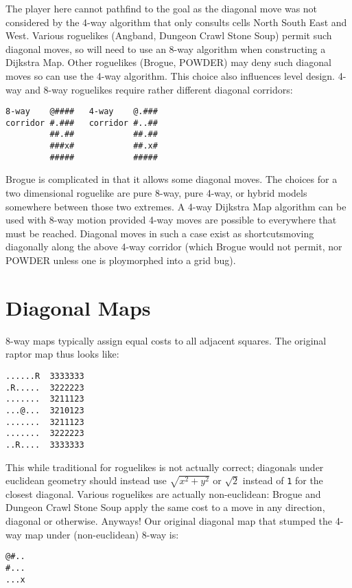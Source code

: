 \documentclass[12pt,a4paper]{article}
\begin{document}
The player here cannot pathfind to the goal as the diagonal move was not
considered by the 4-way algorithm that only consults cells North South
East and West. Various roguelikes (Angband, Dungeon Crawl Stone Soup)
permit such diagonal moves, so will need to use an 8-way algorithm when
constructing a Dijkstra Map. Other roguelikes (Brogue, POWDER) may deny
such diagonal moves so can use the 4-way algorithm. This choice also
influences level design. 4-way and 8-way roguelikes require rather
different diagonal corridors:

\begin{verbatim}
8-way    @####   4-way    @.###
corridor #.###   corridor #..##
         ##.##            ##.##
         ###x#            ##.x#
         #####            #####
\end{verbatim}

Brogue is complicated in that it allows some diagonal moves. The choices
for a two dimensional roguelike are pure 8-way, pure 4-way, or hybrid
models somewhere between those two extremes. A 4-way Dijkstra Map
algorithm can be used with 8-way motion provided 4-way moves are
possible to everywhere that must be reached. Diagonal moves in such a
case exist as shortcuts\textendash moving diagonally along the above
4-way corridor (which Brogue would not permit, nor POWDER unless one is
ploymorphed into a grid bug).

\section*{Diagonal Maps}

8-way maps typically assign equal costs to all adjacent squares. The
original raptor map thus looks like:

\begin{verbatim}
......R  3333333
.R.....  3222223
.......  3211123
...@...  3210123
.......  3211123
.......  3222223
..R....  3333333
\end{verbatim}

This while traditional for roguelikes is not actually correct; diagonals
under euclidean geometry should instead use $\sqrt{x^2 + y^2}$ or
$\sqrt{2}$ instead of \texttt{1} for the closest diagonal. Various
roguelikes are actually non-euclidean: Brogue and Dungeon Crawl Stone
Soup apply the same cost to a move in any direction, diagonal or
otherwise. Anyways! Our original diagonal map that stumped the 4-way map
under (non-euclidean) 8-way is:

\begin{verbatim}
@#..
#...
...x
\end{verbatim}
\end{document}
